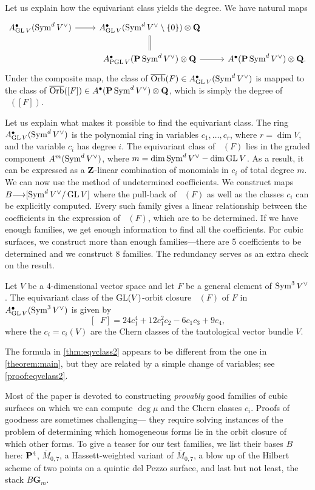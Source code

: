 \documentclass[12pt,reqno]{amsart}
\DeclareMathOperator{\Orb}{\overline{Orb}}
\renewcommand{\to}{{\longrightarrow}}
\numberwithin{equation}{section}
\newcommand{\G}{\mathbf G}
\begin{document}
Let us explain how the equivariant class yields the degree.
We have natural maps
\[
\begin{tikzcd}
  A^\bullet_{\GL V}(\Sym^dV^\vee) \ar{r}& A^\bullet_{\GL V}(\Sym^d V^\vee \setminus
  \{0\}) \otimes \Q \ar[equal]{d}\\
  &A^\bullet_{\PGL V}(\P \Sym^dV^\vee) \otimes \Q \ar{r}&
  A^\bullet(\P \Sym^dV^\vee) \otimes \Q.
\end{tikzcd}
\]
Under the composite map, the class of $\Orb(F) \in A^\bullet_{\GL
  V}(\Sym^dV^\vee)$ is mapped to the class of $\Orb([F]) \in
A^\bullet(\P \Sym^dV^\vee) \otimes \Q$, which is simply the degree of $\Orb([F])$.

Let us explain what makes it possible to find the equivariant
class.  The ring $A^\bullet_{\GL V}(\Sym^dV^\vee)$ is the polynomial ring
in variables $c_1, \dots, c_r$, where $r = \dim V$, and the variable
$c_i$ has degree $i$.  The equivariant class of $\Orb(F)$ lies in the
graded component $A^m(\Sym^dV^\vee)$, where
$m = \dim \Sym^d V^\vee - \dim \GL V$.  As a result, it can be expressed as
a $\Z$-linear combination of monomials in $c_i$ of total degree
$m$. We can now use the method of undetermined coefficients.  We
construct maps $B \to [\Sym^dV^\vee/\GL V]$ where the pull-back of
$\Orb(F)$ as well as the classes $c_i$ can be explicitly
computed. Every such family gives a linear relationship between the
coefficients in the expression of $\Orb(F)$, which are to be determined.
If we have enough families, we get enough information to find all the coefficients.
For cubic surfaces, we construct more than enough families---there are 5
coefficients to be determined and we construct 8 families. The redundancy
serves as an extra check on the result.
\begin{theorem}\label{thm:eqvclass2}
  Let $V$ be a 4-dimensional vector space and let $F$ be a general
  element of $\Sym^3 V^\vee$.
  The equivariant class of the $\GL(V)$-orbit closure $\Orb(F)$ of $F$
  in $A^\bullet_{\GL V}(\Sym^3 V^\vee)$ is given by
  \[
    [\Orb F] = 24c_1^4 + 12c_1^2c_2 - 6c_1c_3 + 9c_4,
  \]
  where the \(c_i = c_i(V)\) are the Chern classes of the tautological vector
  bundle $V$.
\end{theorem}
The formula in \autoref{thm:eqvclass2} appears to be different from the one
in \autoref{theorem:main}, but they are related by a simple change of
variables; see \autoref{proof:eqvclass2}.

Most of the paper is devoted to constructing {\sl provably} good
families of cubic surfaces on which we can compute $\deg \mu$ and the
Chern classes $c_i$.  Proofs of goodness are sometimes challenging---
they require solving instances of the problem of determining which
homogeneous forms lie in the orbit closure of which other forms.
To give a teaser for our test families, we list their
bases $B$ here: $\P^4$, $\overline M_{0,7}$, a
Hassett-weighted variant of $\overline M_{0,7}$, a blow up of the
Hilbert scheme of two points on a quintic del Pezzo surface, and last
but not least, the stack $B\G_m$.
\end{document}
